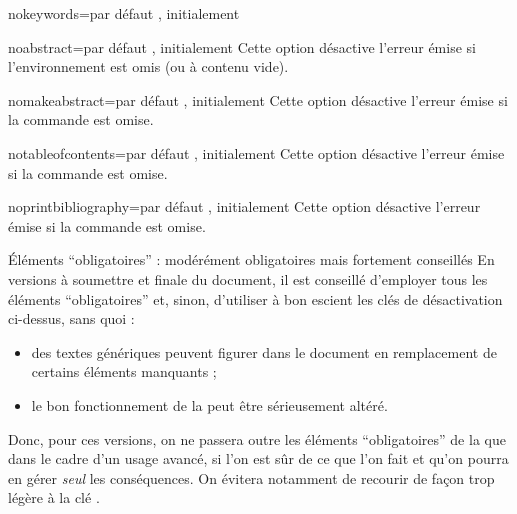 \begin{description}
\begin{docKey}{nokeywords}{=\textbar{}}{par
      défaut , initialement }
  \end{docKey}
  \begin{docKey}{noabstract}{=\textbar{}}{par
      défaut , initialement }
    Cette option désactive l'erreur émise si l'environnement 
    est omis (ou à contenu vide).
  \end{docKey}
  \begin{docKey}{nomakeabstract}{=\textbar{}}{par
      défaut , initialement }
    Cette option désactive l'erreur émise si la commande 
    est omise.
  \end{docKey}
  \begin{docKey}{notableofcontents}{=\textbar{}}{par
      défaut , initialement }
    Cette option désactive l'erreur émise si la commande
     est omise.
  \end{docKey}
  \begin{docKey}{noprintbibliography}{=\textbar{}}{par
      défaut , initialement }
    Cette option désactive l'erreur émise si la commande
     est omise.
  \end{docKey}
\end{description}

\begin{dbwarning}{Éléments \enquote{obligatoires} : modérément obligatoires
    mais fortement conseillés}{}
  En versions à soumettre et finale du document, il est conseillé d'employer
  tous les éléments \enquote{obligatoires} et, sinon, d'utiliser à bon escient
  les clés de désactivation ci-dessus, sans quoi :
  \begin{itemize}
  \item des textes génériques peuvent figurer dans le document en remplacement
    de certains éléments manquants ;
  \item le bon fonctionnement de la \yatcl{} peut être sérieusement altéré.
  \end{itemize}
  Donc, pour ces versions, on ne passera outre les éléments
  \enquote{obligatoires} de la \yatcl{} que dans le cadre d'un usage avancé, si
  l'on est sûr de ce que l'on fait et qu'on pourra en gérer \emph{seul} les
  conséquences.  On évitera notamment de recourir de façon trop légère à la clé
  .
\end{dbwarning}

%
\iffalse
\fi
